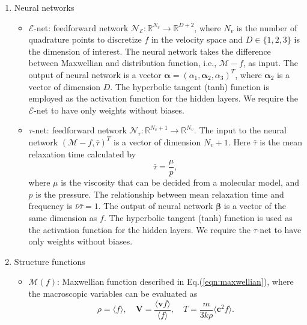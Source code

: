 \documentclass[preprint,3p,12pt,sort&compress]{elsarticle}
\begin{document}
\begin{enumerate}
    \item[(1)] Neural networks
    \begin{itemize}
        \item{$\mathcal E$-net}: feedforward network $\mathcal N_\mathcal E : \mathbb R^{N_v} \rightarrow \mathbb R^{D+2}$, where $N_v$ is the number of quadrature points to discretize $f$ in the velocity space and $D\in\{1,2,3\}$ is the dimension of interest.
        The neural network takes the difference between Maxwellian and distribution function, i.e., $\mathcal M - f$, as input.
        The output of neural network is a vector $ \boldsymbol \alpha=(\alpha_1,\boldsymbol \alpha_2,\alpha_3)^T$, where $\boldsymbol \alpha_2$ is a vector of dimension $D$.
        The hyperbolic tangent (tanh) function is employed as the activation function for the hidden layers.
        We require the $\mathcal E$-net to have only weights without biases.
        \item{$\tau$-net}: feedforward network $\mathcal N_\tau : \mathbb R^{N_v+1} \rightarrow \mathbb R^{N_v}$.
        The input to the neural network $(\mathcal M-f, \bar \tau)^T$ is a vector of dimension $N_v+1$.
        Here $\bar\tau$ is the mean relaxation time calculated by
        \begin{equation}
            \bar \tau = \frac{\mu}{p},
        \end{equation}
        where $\mu$ is the viscosity that can be decided from a molecular model, and $p$ is the pressure.
        The relationship between mean relaxation time and frequency is $\bar\nu \bar\tau=1$.
        The output of neural network $\boldsymbol\beta$ is a vector of the same dimension as $f$.
        The hyperbolic tangent (tanh) function is used as the activation function for the hidden layers.
        We require the $\tau$-net to have only weights without biases.
    \end{itemize}
    \item[(2)] Structure functions
    \begin{itemize}
        \item{$\mathcal M(f)$}: Maxwellian function described in Eq.(\ref{eqn:maxwellian}), where the macroscopic variables can be evaluated as
        \begin{equation}
            \rho = \langle f \rangle, \quad 
            \mathbf V = \frac{\langle \mathbf v f \rangle}{\langle f \rangle}, \quad
            T = \frac{m}{3k\rho} \langle \mathbf c^2 f \rangle.
        \end{equation}

\end{itemize}
\end{enumerate}
\end{document}
